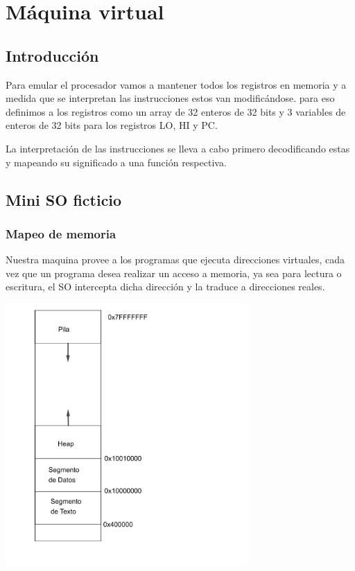 \documentclass[12pt]{article}
\begin{document}
   
\section{Máquina virtual}
\subsection{Introducción}
Para emular el procesador vamos a mantener todos los registros en memoria y a
medida que se interpretan las instrucciones estos van modificándose.
para eso definimos a los registros como un array de 32 enteros de 32 bits
y 3 variables de enteros de 32 bits para  los registros LO, HI y PC.

La interpretación de las instrucciones se lleva a cabo primero decodificando
estas y mapeando su significado a una función respectiva.
\subsection{Mini SO ficticio}
\subsubsection{Mapeo de memoria}
Nuestra maquina provee a los programas que ejecuta direcciones virtuales,
cada vez que un programa desea realizar un acceso a memoria, ya sea para lectura o escritura,
el SO intercepta dicha dirección y la traduce a direcciones reales. 

\begin{center}
\includegraphics[height=10cm]{mdetails.png}
\end{center}
\end{document}
